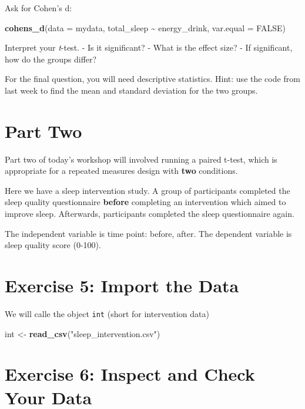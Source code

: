 \documentclass[
]{book}
\newenvironment{Shaded}{\begin{snugshade}}{\end{snugshade}}
\newcommand{\AttributeTok}[1]{\textcolor[rgb]{0.13,0.29,0.53}{#1}}
\newcommand{\ConstantTok}[1]{\textcolor[rgb]{0.56,0.35,0.01}{#1}}
\newcommand{\FunctionTok}[1]{\textcolor[rgb]{0.13,0.29,0.53}{\textbf{#1}}}
\newcommand{\NormalTok}[1]{#1}
\newcommand{\OtherTok}[1]{\textcolor[rgb]{0.56,0.35,0.01}{#1}}
\newcommand{\SpecialCharTok}[1]{\textcolor[rgb]{0.81,0.36,0.00}{\textbf{#1}}}
\newcommand{\StringTok}[1]{\textcolor[rgb]{0.31,0.60,0.02}{#1}}
\let\oldsection\section
\renewcommand{\section}{\needspace{5\baselineskip}\oldsection}
\begin{document}
Ask for Cohen's d:

\begin{Shaded}
\begin{Highlighting}[]
\FunctionTok{cohens\_d}\NormalTok{(}\AttributeTok{data =}\NormalTok{ mydata, total\_sleep }\SpecialCharTok{\textasciitilde{}}\NormalTok{ energy\_drink, }\AttributeTok{var.equal =} \ConstantTok{FALSE}\NormalTok{)}
\end{Highlighting}
\end{Shaded}

Interpret your \emph{t}-test.
- Is it significant?
- What is the effect size?
- If significant, how do the groups differ?

For the final question, you will need descriptive statistics. Hint: use the code from last week to find the mean and standard deviation for the two groups.

\section{Part Two}\label{part-two}

Part two of today's workshop will involved running a paired t-test, which is appropriate for a repeated measures design with \textbf{two} conditions.

Here we have a sleep intervention study. A group of participants completed the sleep quality questionnaire \textbf{before} completing an intervention which aimed to improve sleep. Afterwards, participants completed the sleep questionnaire again.

The independent variable is time point: before, after.
The dependent variable is sleep quality score (0-100).

\section{Exercise 5: Import the Data}\label{exercise-5-import-the-data}

We will calle the object \texttt{int} (short for intervention data)

\begin{Shaded}
\begin{Highlighting}[]
\NormalTok{int }\OtherTok{\textless{}{-}} \FunctionTok{read\_csv}\NormalTok{(}\StringTok{"sleep\_intervention.csv"}\NormalTok{)}
\end{Highlighting}
\end{Shaded}

\section{Exercise 6: Inspect and Check Your Data}\label{exercise-6-inspect-and-check-your-data}
\end{document}

